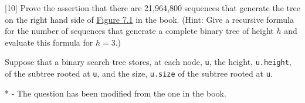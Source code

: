 \documentclass[addpoints]{exam}
\begin{document}
\begin{questions}
  [10]
  Prove the assertion that there are 21,964,800 sequences that generate the tree on the right hand side of \href{http://opendatastructures.org/ods-python/7_1_Random_Binary_Search_Tr.html#fig:rbs-lvc}{Figure 7.1} in the book. (Hint: Give a recursive formula for the number of sequences that generate a complete binary tree of height $h$ and evaluate this formula for $h = 3$.)
  \begin{solution}
  \end{solution}

  Suppose that a binary search tree stores, at each node, {\tt u}, the height, {\tt u.height}, of the subtree rooted at {\tt u}, and the size, {\tt u.size} of the subtree rooted at {\tt u}.
\end{questions}

* - The question has been modified from the one in the book.
\end{document}
